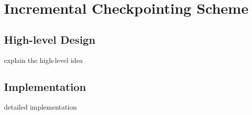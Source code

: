 \documentclass[11pt]{article}
\begin{document}
\section{Incremental Checkpointing Scheme}
\subsection{High-level Design}
explain the high-level idea
\subsection{Implementation}
detailed implementation

%

\end{document}

